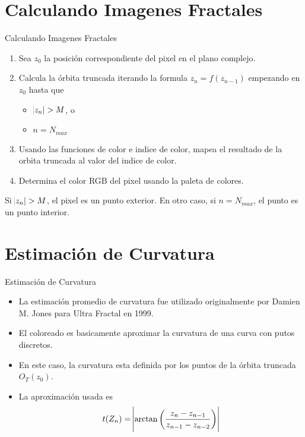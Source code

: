 \documentclass[11pt]{beamer}
\begin{document}
\section{Calculando Imagenes Fractales}
\begin{frame}{Calculando Imagenes Fractales}
\begin{enumerate}
	\item Sea $z_0$ la posición correspondiente del pixel en el plano complejo.
	\item Calcula la órbita truncada iterando la formula $z_n = f(z_{n-1})$ empezando en $z_0$ hasta que
	\begin{itemize}
		\item $\abs{z_n} > M$, o
		\item $n = N_{max}$
	\end{itemize}
	
	\item Usando las funciones de color e indice de color, mapea el resultado de la orbita truncada al valor del indice de color.
	
	\item Determina el color RGB del pixel usando la paleta de colores.
\end{enumerate}

Si $\abs{z_n} > M$, el pixel es un punto exterior. En otro caso, si $n = N_{max}$, el punto es un punto interior.

\end{frame}

\section{Estimación de Curvatura}
\begin{frame}{Estimación de Curvatura}
	\begin{itemize}
		\item La estimación promedio de curvatura fue utilizado originalmente por Damien M. Jones para Ultra Fractal en 1999.
		
		\item El coloreado es basicamente aproximar la curvatura de una curva con putos discretos. 
		\item En este caso, la curvatura esta definida por los puntos de la órbita truncada $O_T(z_0)$.
		\item La aproximación usada es 
		\[ t(Z_n) = \abs{ \arctan \del{\frac{z_n - z_{n-1}}{z_{n-1} - z_{n-2}}} } \]
	\end{itemize}
\end{frame}
\end{document}
